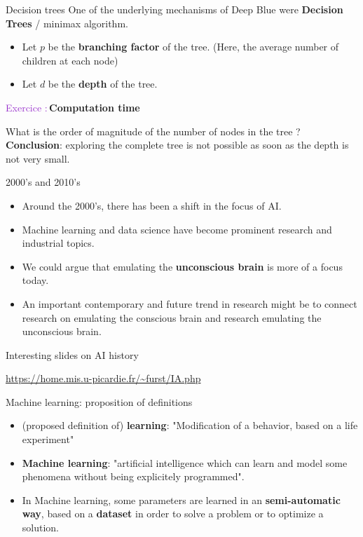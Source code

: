 \documentclass[usenames,dvipsnames]{beamer}
\newcounter{numexos}%
\newcommand{\exercice}[1]{%
\addtocounter{numexos}{1}%
\textcolor{DarkOrchid}{Exercice\,\thenumexos\,:}\,#1%
}
\begin{document}
\begin{frame}{Decision trees}
    One of the underlying mechanisms of Deep Blue were \textbf{{Decision
    Trees}} / minimax algorithm.
    \begin{itemize}
	\item Let $p$ be the \textbf{{branching factor}} of the tree. (Here, the average number of children at each node)
	\item Let $d$ be the \textbf{{depth}} of the tree. 
    \end{itemize}
    \exercice{\textbf{Computation time}}
	What is the order of magnitude of the number of nodes in the tree ?
    \textbf{Conclusion}: exploring the complete tree is not possible as soon as the depth is not very small.
\end{frame}

\begin{frame}{2000's and 2010's}
    \begin{itemize}
        \item Around the 2000's, there has been a shift in the focus of AI.
        \item Machine learning and data science have become prominent research and industrial topics.
        \item We could argue that emulating the \textbf{{unconscious brain}} is
            more of a focus today.
        \item An important contemporary and future trend in research might be
            to connect research on emulating the conscious brain and research
            emulating the unconscious brain.
    \end{itemize}
\end{frame}

\begin{frame}{Interesting slides on AI history}

    \url{https://home.mis.u-picardie.fr/~furst/IA.php} 

\end{frame}

\begin{frame}{Machine learning: proposition of definitions}
    \begin{itemize}
        \item (proposed definition of) \textbf{learning}: "Modification of a behavior, based on a life experiment"
        \item \textbf{{Machine learning}}: "artificial intelligence which can learn
    and model some phenomena without being explicitely programmed".
        \item In Machine learning, some parameters are learned in an
            \textbf{semi-automatic way}, based on a \textbf{dataset} in order to solve a problem or to optimize a
            solution.
    \end{itemize}
\end{frame}
\end{document}
